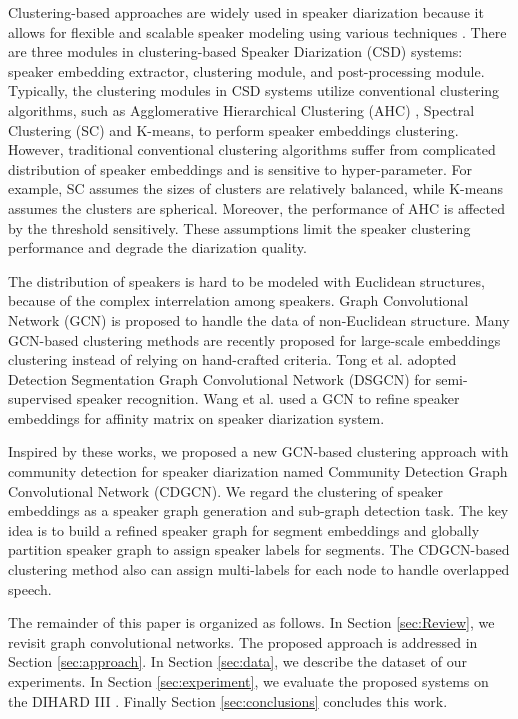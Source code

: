\documentclass[10pt]{article}
\begin{document}
Clustering-based approaches are widely used in speaker diarization because it allows for flexible and scalable speaker modeling using various techniques \cite{shum2013unsupervised}\cite{sell2014speaker}\cite{ning2006spectral}. There are three modules in clustering-based Speaker Diarization (CSD) systems: speaker embedding extractor, clustering module, and post-processing module. Typically, the clustering modules in CSD systems utilize conventional clustering algorithms, such as Agglomerative Hierarchical Clustering (AHC) \cite{sell2016priors}\cite{xiao2021microsoft}, Spectral Clustering (SC) \cite{wang22ha_interspeech}\cite{lin2020self}\cite{lin19_interspeech} and K-means\cite{wang2018speaker}, to perform speaker embeddings clustering. However, traditional conventional clustering algorithms suffer from complicated distribution of speaker embeddings \cite{shi2000normalized} and is sensitive to hyper-parameter. For example, SC assumes the sizes of clusters are relatively balanced, while K-means assumes the clusters are spherical. Moreover, the performance of AHC is affected by the threshold sensitively. These assumptions limit the speaker clustering performance and degrade the diarization quality.

The distribution of speakers is hard to be modeled with Euclidean structures, because of the complex interrelation among speakers. Graph Convolutional Network (GCN) \cite{welling2016semi} is proposed to handle the data of non-Euclidean structure. Many GCN-based clustering methods are recently proposed for large-scale embeddings clustering instead of relying on hand-crafted criteria. Tong et al. \cite{tong2022graph} adopted Detection Segmentation Graph Convolutional Network (DSGCN) for semi-supervised speaker recognition. Wang et al. \cite{wang2020speaker} used a GCN to refine speaker embeddings for affinity matrix on speaker diarization system.

Inspired by these works, we proposed a new GCN-based clustering approach with community detection for speaker diarization named Community Detection Graph Convolutional Network (CDGCN). We regard the clustering of speaker embeddings as a speaker graph generation and sub-graph detection task. The key idea is to build a refined speaker graph for segment embeddings and globally partition speaker graph to assign speaker labels for segments. The CDGCN-based clustering method also can assign multi-labels for each node to handle overlapped speech. 

The remainder of this paper is organized as follows. In Section \ref{sec:Review}, we revisit graph convolutional networks. The proposed approach is addressed in Section \ref{sec:approach}. In Section \ref{sec:data}, we describe the dataset of our experiments. In Section \ref{sec:experiment}, we evaluate the proposed systems on the DIHARD III \cite{ryant2020third}. Finally Section \ref{sec:conclusions} concludes this work.
\end{document}
